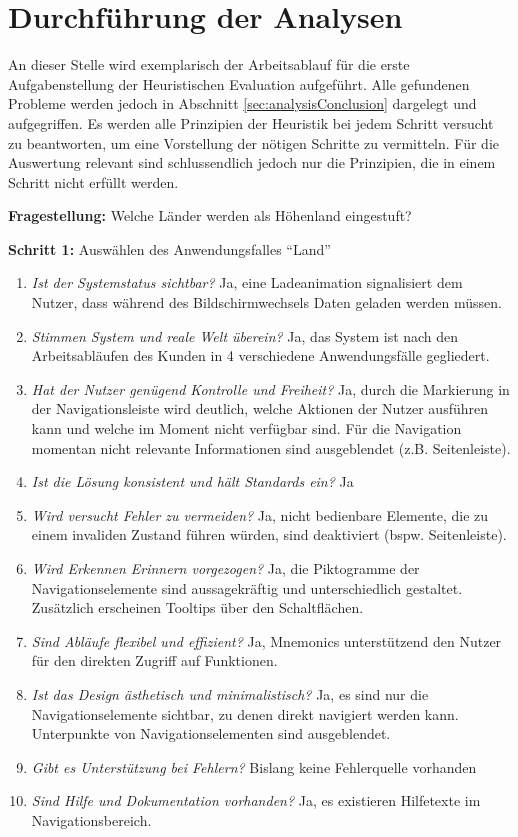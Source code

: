 \section{Durchführung der Analysen} \label{sec:analysisExecution}
An dieser Stelle wird exemplarisch der Arbeitsablauf für die erste Aufgabenstellung der Heuristischen Evaluation aufgeführt. Alle gefundenen Probleme werden jedoch in Abschnitt \ref{sec:analysisConclusion} dargelegt und aufgegriffen. Es werden alle Prinzipien der Heuristik bei jedem Schritt versucht zu beantworten, um eine Vorstellung der nötigen Schritte zu vermitteln. Für die Auswertung relevant sind schlussendlich jedoch nur die Prinzipien, die in einem Schritt nicht erfüllt werden.\par
\textbf{Fragestellung:} Welche Länder werden als Höhenland eingestuft?\par
\textbf{Schritt 1:} Auswählen des Anwendungsfalles \enquote{Land}
\begin{enumerate}
 \item \textit{Ist der Systemstatus sichtbar?} Ja, eine Ladeanimation signalisiert dem Nutzer, dass während des Bildschirmwechsels Daten geladen werden müssen.
 \item \textit{Stimmen System und reale Welt überein?} Ja, das System ist nach den Arbeitsabläufen des Kunden in 4 verschiedene Anwendungsfälle gegliedert.
 \item \textit{Hat der Nutzer genügend Kontrolle und Freiheit?} Ja, durch die Markierung in der Navigationsleiste wird deutlich, welche Aktionen der Nutzer ausführen kann und welche im Moment nicht verfügbar sind. Für die Navigation momentan nicht relevante Informationen sind ausgeblendet (z.B. Seitenleiste).
 \item \textit{Ist die Lösung konsistent und hält Standards ein?} Ja
 \item \textit{Wird versucht Fehler zu vermeiden?} Ja, nicht bedienbare Elemente, die zu einem invaliden Zustand führen würden, sind deaktiviert (bspw. Seitenleiste).
 \item \textit{Wird Erkennen Erinnern vorgezogen?} Ja, die Piktogramme der Navigationselemente sind aussagekräftig und unterschiedlich gestaltet. Zusätzlich erscheinen Tooltips über den Schaltflächen.
 \item \textit{Sind Abläufe flexibel und effizient?} Ja, Mnemonics unterstützend den Nutzer für den direkten Zugriff auf Funktionen.
 \item \textit{Ist das Design ästhetisch und minimalistisch?} Ja, es sind nur die Navigationselemente sichtbar, zu denen direkt navigiert werden kann. Unterpunkte von Navigationselementen sind ausgeblendet.
 \item \textit{Gibt es Unterstützung bei Fehlern?} Bislang keine Fehlerquelle vorhanden
 \item \textit{Sind Hilfe und Dokumentation vorhanden?} Ja, es existieren Hilfetexte im Navigationsbereich. 
\end{enumerate}
